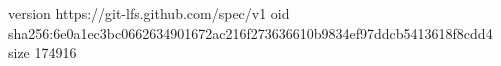 version https://git-lfs.github.com/spec/v1
oid sha256:6e0a1ec3bc0662634901672ac216f273636610b9834ef97ddcb5413618f8cdd4
size 174916
